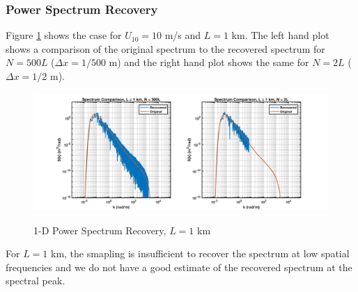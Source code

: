 \subsubsection{Power Spectrum Recovery}
Figure \ref{os_fig:7bbb} shows the case for $U_{10} = 10$ m/s and $L = 1$ km. The left hand plot shows a comparison of the original spectrum to the recovered spectrum for $N = 500L$ ($\Delta x = 1/500$ m) and the right hand plot shows the same for $N=2L$ ($\Delta x = 1/2$ m).
\begin{figure}[H]
  \begin{center}
\includegraphics[width=6in]{../media/Ocean_Surface/sea_surface_spectra_1000.png}
  \end{center}
  \renewcommand{\baselinestretch}{1} \small\normalsize
  \begin{quote}
    \caption[1-D Power Spectrum Recovery, $L = 1$ km]{1-D Power Spectrum Recovery, $L = 1$ km\label{os_fig:7bbb}}
  \end{quote}
\end{figure}
\renewcommand{\baselinestretch}{2} \small\normalsize
For $L = 1$ km, the smapling is insufficient to recover the spectrum at low spatial frequencies and we do not have a good estimate of the recovered spectrum at the spectral peak.

